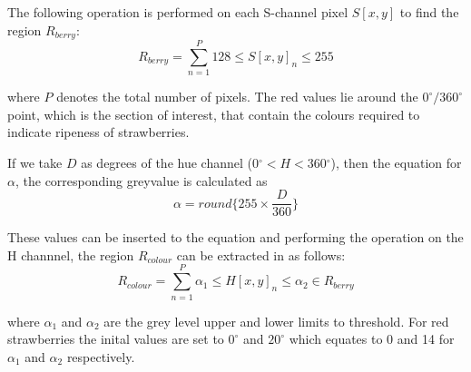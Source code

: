 \documentclass[fleqn,twoside]{article}
\begin{document}
The following operation is performed on each S-channel pixel $S[x,y]$ to find the region $R_{berry}$:
\begin{equation}
R_{berry} = \sum_{n=1}^{P} 128 \leq S[x,y]_n \leq 255
\end{equation}

where $P$ denotes the total number of pixels. The red values lie around the $0^{\circ}/ 360^{\circ}$ point, which is the section of interest, that contain the colours required to indicate ripeness of strawberries.

If we take $D$ as degrees of the hue channel ($0{^\circ}<H<360{^\circ}$), then the equation for $\alpha$, the corresponding greyvalue is calculated as
\begin{equation}
\alpha = round\Big\{255\times \frac{D}{360}\Big\}
\end{equation}

These values can be inserted to the equation and performing the operation on the H channnel, the region $R_{colour}$ can be extracted in as follows:
\begin{equation}
R_{colour} = \sum_{n=1}^{P} \alpha_1 \leq H[x,y]_n \leq \alpha_2 \in R_{berry}
\end{equation}


where $\alpha_1$ and $\alpha_2$ are the grey level upper and lower limits to threshold. For red strawberries the inital values are set to $0^{\circ}$ and $20^{\circ}$ which equates to 0 and 14 for $\alpha_1$ and $\alpha_2$ respectively.
\end{document}
